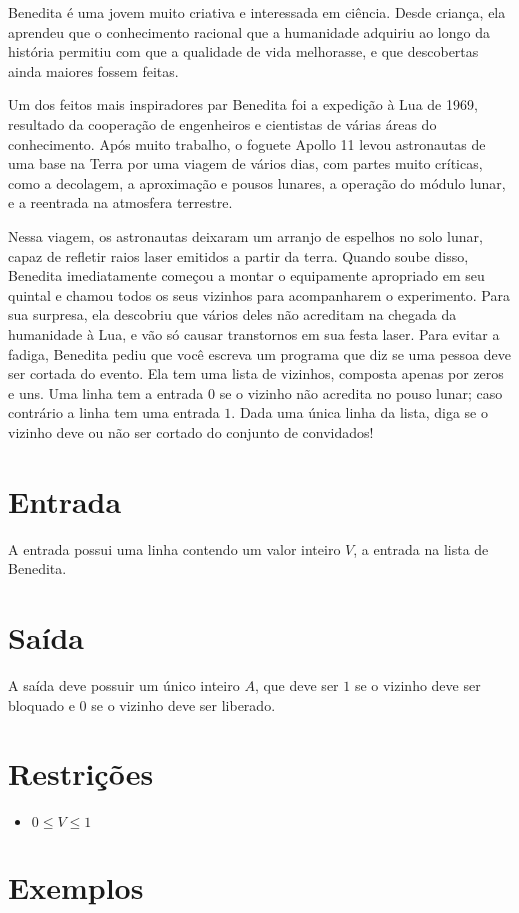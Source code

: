 %

Benedita é uma jovem muito criativa e interessada em ciência. Desde criança, ela aprendeu que o conhecimento racional
que a humanidade adquiriu ao longo da história permitiu com que a qualidade de vida melhorasse,
e que descobertas ainda maiores fossem feitas.

Um dos feitos mais inspiradores par Benedita foi a expedição à Lua de 1969, resultado da cooperação
de engenheiros e cientistas de várias áreas do conhecimento. Após muito trabalho, o foguete Apollo 11 levou astronautas
de uma base na Terra por uma viagem de vários dias, com partes muito críticas, como a decolagem, a aproximação e pousos lunares,
a operação do módulo lunar, e a reentrada na atmosfera terrestre.

Nessa viagem, os astronautas deixaram um arranjo de espelhos no solo lunar, capaz de refletir raios laser emitidos a partir da terra.
Quando soube disso, Benedita imediatamente começou a montar o equipamente apropriado em seu quintal e chamou todos os seus vizinhos
para acompanharem o experimento.
Para sua surpresa, ela descobriu que vários deles não acreditam na chegada da humanidade à Lua, e vão só causar transtornos
em sua festa laser.
Para evitar a fadiga, Benedita pediu que você escreva um programa que diz se uma pessoa deve ser cortada do evento.
Ela tem uma lista de vizinhos, composta apenas por zeros e uns.
Uma linha tem a entrada $0$ se o vizinho não acredita no pouso lunar; caso contrário a linha tem uma entrada $1$.
Dada uma única linha da lista, diga se o vizinho deve ou não ser cortado do conjunto de convidados!

\section*{Entrada}

A entrada possui uma linha contendo um valor inteiro $V$, a entrada na lista de Benedita.

\section*{Saída}

A saída deve possuir um único inteiro $A$, que deve ser $1$ se o vizinho deve ser bloquado e $0$ se o vizinho deve ser liberado.

\section*{Restrições}

\begin{itemize}
	\item $0 \leq V \leq 1$
\end{itemize}


\section*{Exemplos}

\exemplo
